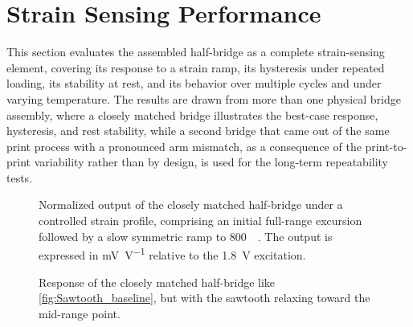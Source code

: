 \section{Strain Sensing Performance}\label{sec:strain_sensing_performance}

This section evaluates the assembled half-bridge as a complete strain-sensing element, covering its response to a strain ramp, its hysteresis under repeated loading, its stability at rest, and its behavior over multiple cycles and under varying temperature. The results are drawn from more than one physical bridge assembly, where a closely matched bridge illustrates the best-case response, hysteresis, and rest stability, while a second bridge that came out of the same print process with a pronounced arm mismatch, as a consequence of the print-to-print variability rather than by design, is used for the long-term repeatability tests.

\begin{figure}[!b]
\centering

    \caption{Normalized output of the closely matched half-bridge under a controlled strain profile, comprising an initial full-range excursion followed by a slow symmetric ramp to \SI{800}{\micro\strain}. The output is expressed in \si{\milli\volt\per\volt} relative to the \SI{1.8}{\volt} excitation.}
    \label{fig:Wheatstone2}
\end{figure}

\begin{figure}[p]
\centering
\vspace*{\fill}

    \caption{Response of the closely matched half-bridge to a decreasing-amplitude sawtooth strain relaxing toward the unloaded start point. Top: normalized output and commanded strain against time. Bottom: the corresponding loop of output against strain, colored by elapsed time.}
    \label{fig:Sawtooth_baseline}
\vspace*{\fill}

    \caption{Response of the closely matched half-bridge like \cref{fig:Sawtooth_baseline}, but with the sawtooth relaxing toward the mid-range point.}
    \label{fig:Sawtooth_center}
\vspace*{\fill}
\end{figure}

